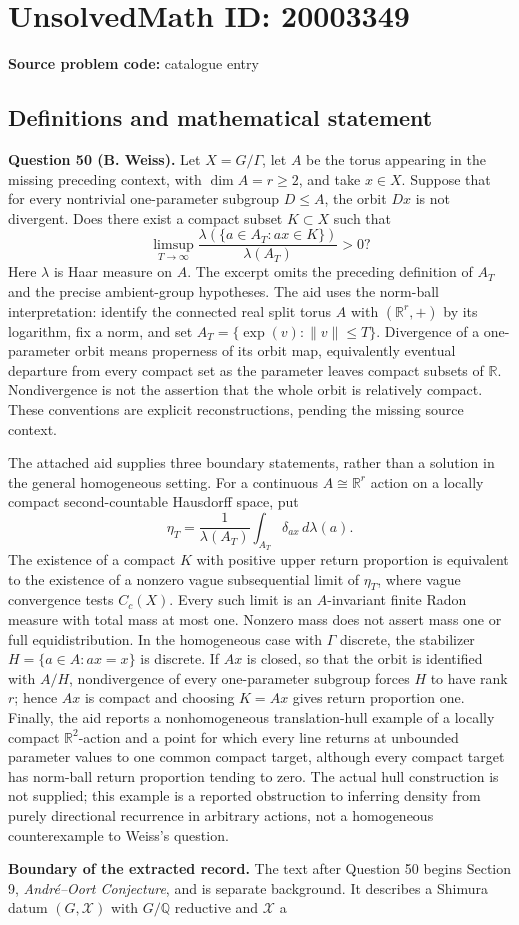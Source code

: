 \documentclass[11pt]{article}
\newcommand{\Q}{\mathbb{Q}}
\newcommand{\R}{\mathbb{R}}
\begin{document}
\section*{UnsolvedMath ID: 20003349}
\textbf{Source problem code:} catalogue entry
\subsection{Definitions and mathematical statement}
\textbf{Question 50 (B. Weiss).} Let \(X=G/\Gamma\), let \(A\) be the torus appearing in the missing preceding context, with \(\dim A=r\ge2\), and take \(x\in X\). Suppose that for every nontrivial one-parameter subgroup \(D\le A\), the orbit \(Dx\) is not divergent. Does there exist a compact subset \(K\subset X\) such that\[\limsup_{T\to\infty}\frac{\lambda(\{a\in A_T:ax\in K\})}{\lambda(A_T)}>0?\] Here \(\lambda\) is Haar measure on \(A\). The excerpt omits the preceding definition of \(A_T\) and the precise ambient-group hypotheses. The aid uses the norm-ball interpretation: identify the connected real split torus \(A\) with \((\R^r,+)\) by its logarithm, fix a norm, and set \(A_T=\{\exp(v):\|v\|\le T\}\). Divergence of a one-parameter orbit means properness of its orbit map, equivalently eventual departure from every compact set as the parameter leaves compact subsets of \(\R\). Nondivergence is not the assertion that the whole orbit is relatively compact. These conventions are explicit reconstructions, pending the missing source context.\par The attached aid supplies three boundary statements, rather than a solution in the general homogeneous setting. For a continuous \(A\cong\R^r\) action on a locally compact second-countable Hausdorff space, put\[\eta_T=\frac1{\lambda(A_T)}\int_{A_T}\delta_{ax}\,d\lambda(a).\] The existence of a compact \(K\) with positive upper return proportion is equivalent to the existence of a nonzero vague subsequential limit of \(\eta_T\), where vague convergence tests \(C_c(X)\). Every such limit is an \(A\)-invariant finite Radon measure with total mass at most one. Nonzero mass does not assert mass one or full equidistribution. In the homogeneous case with \(\Gamma\) discrete, the stabilizer \(H=\{a\in A:ax=x\}\) is discrete. If \(Ax\) is closed, so that the orbit is identified with \(A/H\), nondivergence of every one-parameter subgroup forces \(H\) to have rank \(r\); hence \(Ax\) is compact and choosing \(K=Ax\) gives return proportion one. Finally, the aid reports a nonhomogeneous translation-hull example of a locally compact \(\R^2\)-action and a point for which every line returns at unbounded parameter values to one common compact target, although every compact target has norm-ball return proportion tending to zero. The actual hull construction is not supplied; this example is a reported obstruction to inferring density from purely directional recurrence in arbitrary actions, not a homogeneous counterexample to Weiss's question.\par \textbf{Boundary of the extracted record.} The text after Question 50 begins Section 9, \emph{Andr\'e--Oort Conjecture}, and is separate background. It describes a Shimura datum \((G,\mathcal X)\) with \(G/\Q\) reductive and \(\mathcal X\) a 
\end{document}
